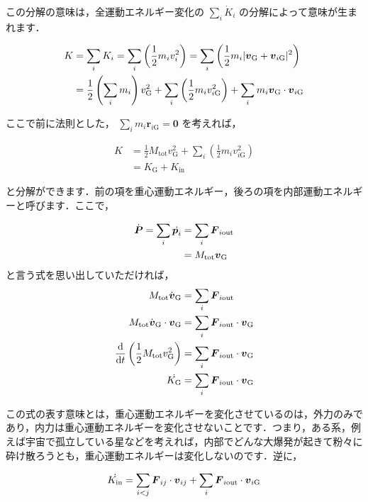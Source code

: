 \documentclass[
  b4paperpaper,
  xelatex,ja=standard]{bxjsbook}
\begin{document}
この分解の意味は，全運動エネルギー変化の \(\sum_i \dot{K}_i\)
の分解によって意味が生まれます．

\begin{align*}
K&=\sum_i K_i=\sum_i\left(\frac{1}{2} m_iv_i^2\right)=\sum_i\left(\frac{1}{2} m_i|\vb*{v}_{\text{G}}+\vb*{v}_{i\text{G}}|^2\right)\\
&= \frac{1}{2}\left(\sum_im_i\right)v_{\text{G}}^2+\sum_i\left(\frac{1}{2} m_iv_{i\text{G}}^2\right)+\sum_im_i\vb*{v}_{\text{G}}\cdot \vb*{v}_{i\text{G}}
\end{align*}

ここで前に法則とした，
\(\sum_i m_i\boldsymbol{r}_{i\text{G}}=\boldsymbol{0}\) を考えれば，

\begin{align*}
K&=\frac{1}{2}M_{\text{tot}}v_{\text{G}}^2+\sum_i\left(\frac{1}{2} m_iv_{i\text{G}}^2\right)\\
&=K_{\text{G}}+K_{\text{in}}
\end{align*}

と分解ができます．前の項を重心運動エネルギー，後ろの項を内部運動エネルギーと呼びます．ここで，

\begin{align*}
\dot{\vb*{P}}=\sum_i \dot{\boldsymbol{p}_i} &= \sum_i\boldsymbol{F}_{i\text{out}}\\
&=M_{\text{tot}}\boldsymbol{v}_{\text{G}} 
\end{align*} と言う式を思い出していただければ， \begin{align*}
M_{\text{tot}}\dot{\boldsymbol{v}}_{\text{G}}&=\sum_i\boldsymbol{F}_{i\text{out}}\\
M_{\text{tot}}\dot{\boldsymbol{v}}_{\text{G}}\cdot \boldsymbol{v}_{\text{G}}&=\sum_i\boldsymbol{F}_{i\text{out}}\cdot \boldsymbol{v}_{\text{G}}\\
\dv{t}\left(\frac{1}{2}M_{\text{tot}}v_{\text{G}}^2 \right)&=\sum_i\boldsymbol{F}_{i\text{out}}\cdot \boldsymbol{v}_{\text{G}}\\
\dot{K_{\text{G}}}&=\sum_i\boldsymbol{F}_{i\text{out}}\cdot \boldsymbol{v}_{\text{G}}
\end{align*}

この式の表す意味とは，重心運動エネルギーを変化させているのは，外力のみであり，内力は重心運動エネルギーを変化させないことです．つまり，ある系，例えば宇宙で孤立している星などを考えれば，内部でどんな大爆発が起きて粉々に砕け散ろうとも，重心運動エネルギーは変化しないのです．逆に，

\[
\dot{K_{\text{in}}}=\sum_{i<j}\boldsymbol{F}_{ij}\cdot\boldsymbol{v}_{ij}+\sum_i\boldsymbol{F}_{i\text{out}}\cdot\vb*{v}_{i\text{G}}
\]
\end{document}
